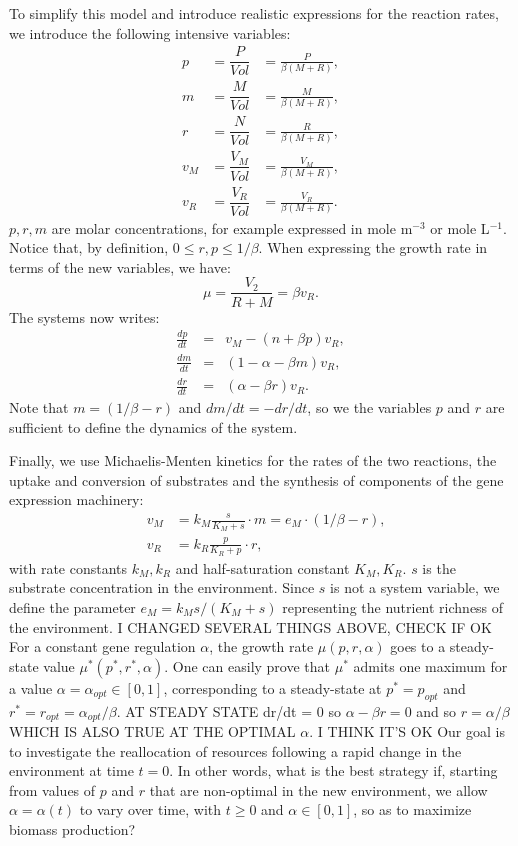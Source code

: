 \documentclass[a4paper, 10pt, conference]{ieeeconf}      %
\begin{document}
To simplify this model and introduce realistic expressions for the reaction rates, we introduce the following intensive variables:
\begin{eqnarray*}
p &= \dfrac{P}{\mathit{Vol}} &= \frac{P}{\beta (M+R)}, \\
m &= \dfrac{M}{\mathit{Vol}} &= \frac{M}{\beta (M+R)},\\
r &= \dfrac{N}{\mathit{Vol}} &= \frac{R}{\beta (M+R)},\\
v_M &= \dfrac{V_M}{\mathit{Vol}} &= \frac{V_M}{\beta (M+R)},\\
v_R &= \dfrac{V_R}{\mathit{Vol}} &= \frac{V_R}{\beta (M+R)}.
\end{eqnarray*}
$p,r,m$ are molar concentrations, for example expressed in mole m$^{-3}$ or mole L$^{-1}$. Notice that, by definition, $0 \leq r, p \leq 1/\beta$. When expressing the growth rate in terms of the new variables, we have:
\[
\mu = \frac{V_2}{R+M} = \beta v_R.
\]
The systems now writes:
\begin{eqnarray}
\frac{dp}{dt} &=& v_M - (n + \beta p) v_R, \label{eq:p} \\
\frac{dm}{dt} &=& (1-\alpha - \beta m) v_R, \label{eq:m} \\ 
\frac{dr}{dt} &=& (\alpha - \beta r) v_R. \label{eq:r}
\end{eqnarray}
Note that $m = (1/\beta - r)$ and $dm/dt = - dr/dt$, so we the variables $p$ and $r$ are sufficient to define the dynamics of the system.

Finally, we use Michaelis-Menten kinetics for the rates of the two reactions, the uptake and conversion of substrates and the synthesis of components of the gene expression machinery:
\begin{eqnarray}
&v_M &= k_M \frac{s}{K_M +s} \cdot m = e_M \cdot (1/\beta -r), \\
&v_R &= k_R \frac{p}{K_R + p} \cdot r,
\end{eqnarray}
with rate constants $k_M, k_R$ and half-saturation constant $K_M, K_R$.
$s$ is the substrate concentration in the environment.
Since $s$ is not a system variable, we define the parameter $e_M = k_M s / (K_M + s)$ representing the nutrient richness of the environment.
{\color{blue} I CHANGED SEVERAL THINGS ABOVE, CHECK IF OK}
For a constant gene regulation $\alpha$, the growth rate $\mu(p,r,\alpha)$ goes to a steady-state value $\mu^*(p^*, r^*, \alpha)$. 
One can easily prove that $\mu^*$ admits one maximum for a value $\alpha = \alpha_{opt} \in [0,1]$, corresponding to a steady-state at $p^* = p_{opt}$ and $r^* = r_{opt} = \alpha_{opt}/ \beta$. {\color{blue} AT STEADY STATE dr/dt = 0 so $\alpha - \beta r = 0$ and so $r = \alpha / \beta$ WHICH IS ALSO TRUE AT THE OPTIMAL $\alpha$. I THINK IT'S OK}
Our goal is to investigate the reallocation of resources following a rapid change in the environment at time $t=0$.
In other words, what is the best strategy if, starting from values of $p$ and $r$ that are non-optimal in the new environment, we allow $\alpha = \alpha(t)$ to vary over time, with $t\geq 0$ and $\alpha \in [0, 1]$, so as to maximize biomass production? 
\end{document}
